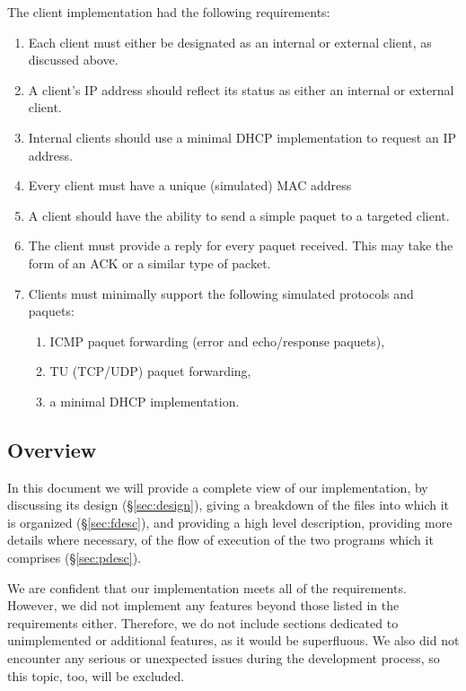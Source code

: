 \documentclass[10pt, a4paper]{article}
\begin{document}
The client implementation had the following requirements:
\begin{enumerate}
  \item Each client must either be designated as an internal or external client,
    as discussed above.
  \item A client's IP address should reflect its status as either an internal or
    external client.
  \item Internal clients should use a minimal DHCP implementation to request an
    IP address.
  \item Every client must have a unique (simulated) MAC address
  \item A client should have the ability to send a simple paquet to a targeted
    client.
  \item The client must provide a reply for every paquet received. This may take
    the form of an ACK or a similar type of packet.
  \item Clients must minimally support the following simulated protocols and
    paquets:
  \begin{enumerate}
    \item ICMP paquet forwarding (error and echo/response paquets),
    \item TU (TCP/UDP) paquet forwarding,
    \item a minimal DHCP implementation.
  \end{enumerate}
\end{enumerate}


\subsection{Overview}
\label{ssec:oview}

In this document we will provide a complete view of our implementation, by
discussing its design (\S\ref{sec:design}), giving a breakdown of the files into
which it is organized (\S\ref{sec:fdesc}), and providing a high level
description, providing more details where necessary, of the flow of execution of
the two programs which it comprises (\S\ref{sec:pdesc}).

We are confident that our implementation meets all of the requirements. However,
we did not implement any features beyond those listed in the requirements
either. Therefore, we do not include sections dedicated to unimplemented or
additional features, as it would be superfluous. We also did not encounter any
serious or unexpected issues during the development process, so this topic, too,
will be excluded.
\end{document}
